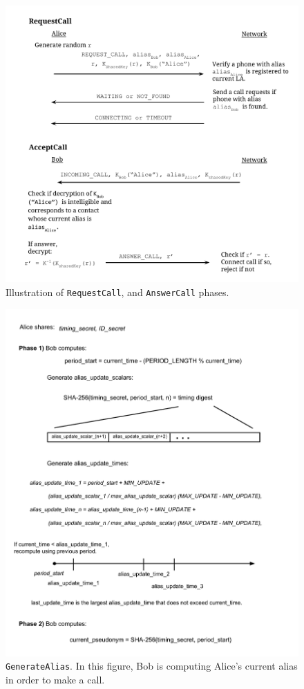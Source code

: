 \documentclass[11pt]{article}
\begin{document}
\begin{figure}[t]
	\caption{Illustration of \texttt{RequestCall}, and \texttt{AnswerCall} phases.}
	\centering
	\includegraphics[scale=.65]{ProtocolsIllustration2.pdf}
\end{figure}

\begin{figure}[t]
	\caption{\texttt{GenerateAlias}. In this figure, Bob is computing Alice's current alias in order to make a call.}
	\centering
	\includegraphics[scale=0.7]{GenerateAlias.pdf}
\end{figure}
\end{document}
